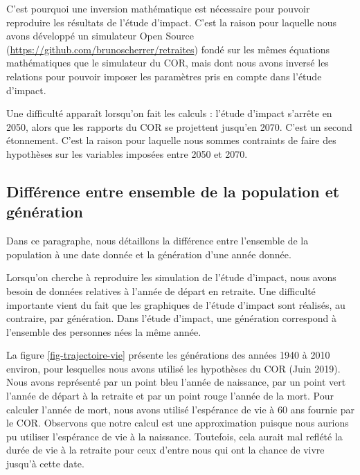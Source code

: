 \documentclass[10pt]{article}
\begin{document}
C'est pourquoi une inversion mathématique est nécessaire pour pouvoir reproduire 
les résultats de l'étude d'impact. 
C'est la raison pour laquelle nous avons développé un simulateur Open Source 
(\url{https://github.com/brunoscherrer/retraites}) fondé sur les mêmes équations mathématiques 
que le simulateur du COR, mais dont nous avons inversé les relations pour 
pouvoir imposer les paramètres pris en compte dans l'étude d'impact. 

Une difficulté apparaît lorsqu'on fait les calculs : 
l'étude d'impact s'arrête en 2050, alors que les rapports du COR 
se projettent jusqu'en 2070. 
C'est un second étonnement. 
C'est la raison pour laquelle nous sommes contraints de faire des 
hypothèses sur les variables imposées entre 2050 et 2070. 


\subsection{Différence entre ensemble de la population et génération}

Dans ce paragraphe, nous détaillons la différence entre 
l'ensemble de la population à une date donnée et la génération d'une année 
donnée. 

Lorsqu'on cherche à reproduire les simulation de l'étude d'impact, nous 
avons besoin de données relatives à l'année de départ en retraite. 
Une difficulté importante vient du fait que les graphiques de l'étude 
d'impact sont réalisés, au contraire, par génération. 
Dans l'étude d'impact, une génération correspond à l'ensemble des personnes 
nées la même année. 

La figure \ref{fig-trajectoire-vie} présente les générations des années 1940 
à 2010 environ, pour lesquelles nous avons utilisé les hypothèses du COR (Juin 2019).
Nous avons représenté par un point bleu l'année de naissance, par un point 
vert l'année de départ à la retraite et par un point rouge l'année de la 
mort. 
Pour calculer l'année de mort, nous avons utilisé l'espérance de vie à 60 ans 
fournie par le COR. 
Observons que notre calcul est une approximation puisque nous aurions pu utiliser 
l'espérance de vie à la naissance. 
Toutefois, cela aurait mal reflété la durée de vie à la retraite pour ceux 
d'entre nous qui ont la chance de vivre jusqu'à cette date. 
\end{document}
